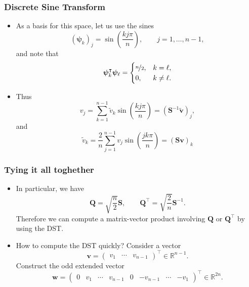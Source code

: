 \begin{frame}
  \frametitle{Discrete Sine Transform}
  \begin{itemize}
  \item As a basis for this space, let us use the sines
    \[
      (\bm \psi_k)_j = \sin\left( \frac{kj\pi}{n} \right),
      \qquad j = 1,\ldots,n-1,
    \]
    and note that
    \[
      \bm \psi_k^\intercal \bm \psi_\ell =
      \begin{cases}
        \nicefrac{n}{2}, & k = \ell, \\
        0, & k \not= \ell.
      \end{cases}
    \]
  \item Thus
    \[
      v_j = \sum_{k=1}^{n-1} \tilde{v}_k \sin \left( \frac{kj\pi}{n} \right)
      = \left( \bm S^{-1} \tilde{\bm v} \right)_j,
    \]
    and
    \[
      \tilde{v}_k = \frac{2}{n} \sum_{j=1}^{n-1} v_j \sin \left( \frac{jk\pi}{n} \right)
      = \left( \bm S \bm v \right)_k
    \]
  \end{itemize}
\end{frame}

\begin{frame}
  \frametitle{Tying it all toghether}
  \begin{itemize}
  \item In particular, we have
    \[
      \bm Q = \sqrt{\frac{n}{2}} \bm S, \qquad
      \bm Q^\intercal = \sqrt{\frac{2}{n}} \bm S^{-1}.
    \]
    Therefore we can compute a matrix-vector product involving $\bm Q$ or
    $\bm Q^\intercal$ by using the DST.
  \item How to compute the DST quickly? Consider a vector
    \[
      \bm v = \begin{pmatrix} v_1 & \cdots & v_{n-1} \end{pmatrix}^\intercal
      \in \mathbb{R}^{n-1}.
    \]
    Construct the odd extended vector
    \[
      \bm w =
      \begin{pmatrix}
        0 & v_1 & \cdots & v_{n-1} & 0 & -v_{n-1} & \cdots & -v_1
      \end{pmatrix}^\intercal
      \in \mathbb{R}^{2n}.
    \]
  \end{itemize}
\end{frame}

